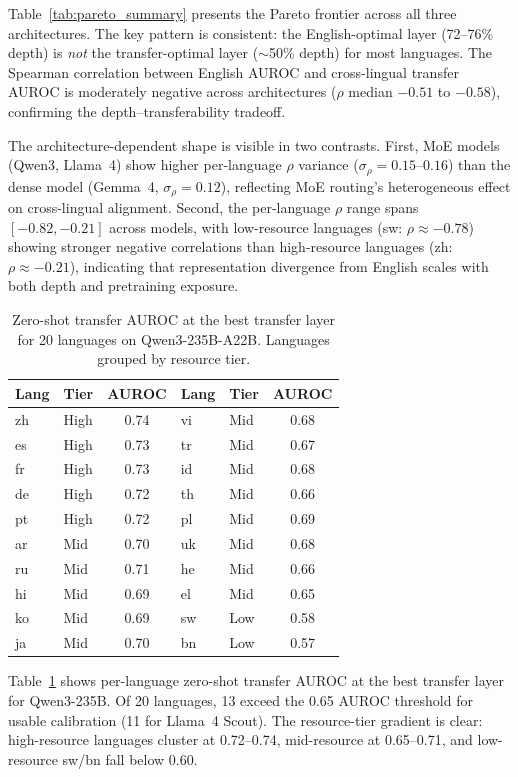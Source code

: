 \documentclass[11pt,a4paper]{article}
\begin{document}
Table~\ref{tab:pareto_summary} presents the Pareto frontier across all three architectures. The key pattern is consistent: the English-optimal layer (72--76\% depth) is \emph{not} the transfer-optimal layer ($\sim$50\% depth) for most languages. The Spearman correlation between English AUROC and cross-lingual transfer AUROC is moderately negative across architectures ($\rho$ median $-0.51$ to $-0.58$), confirming the depth--transferability tradeoff.

The architecture-dependent shape is visible in two contrasts. First, MoE models (Qwen3, Llama~4) show higher per-language $\rho$ variance ($\sigma_\rho = 0.15$--$0.16$) than the dense model (Gemma~4, $\sigma_\rho = 0.12$), reflecting MoE routing's heterogeneous effect on cross-lingual alignment. Second, the per-language $\rho$ range spans $[-0.82, -0.21]$ across models, with low-resource languages (sw: $\rho \approx -0.78$) showing stronger negative correlations than high-resource languages (zh: $\rho \approx -0.21$), indicating that representation divergence from English scales with both depth and pretraining exposure.

\begin{table}[t]
\centering
\small
\caption{Zero-shot transfer AUROC at the best transfer layer for 20 languages on Qwen3-235B-A22B. Languages grouped by resource tier.}
\label{tab:zs_by_lang}
\begin{tabular}{llc|llc}
\toprule
\textbf{Lang} & \textbf{Tier} & \textbf{AUROC} & \textbf{Lang} & \textbf{Tier} & \textbf{AUROC} \\
\midrule
zh & High & 0.74 & vi & Mid & 0.68 \\
es & High & 0.73 & tr & Mid & 0.67 \\
fr & High & 0.73 & id & Mid & 0.68 \\
de & High & 0.72 & th & Mid & 0.66 \\
pt & High & 0.72 & pl & Mid & 0.69 \\
\midrule
ar & Mid & 0.70 & uk & Mid & 0.68 \\
ru & Mid & 0.71 & he & Mid & 0.66 \\
hi & Mid & 0.69 & el & Mid & 0.65 \\
ko & Mid & 0.69 & sw & Low & 0.58 \\
ja & Mid & 0.70 & bn & Low & 0.57 \\
\bottomrule
\end{tabular}
\end{table}

Table~\ref{tab:zs_by_lang} shows per-language zero-shot transfer AUROC at the best transfer layer for Qwen3-235B. Of 20 languages, 13 exceed the 0.65 AUROC threshold for usable calibration (11 for Llama~4 Scout). The resource-tier gradient is clear: high-resource languages cluster at 0.72--0.74, mid-resource at 0.65--0.71, and low-resource sw/bn fall below 0.60.
\end{document}
